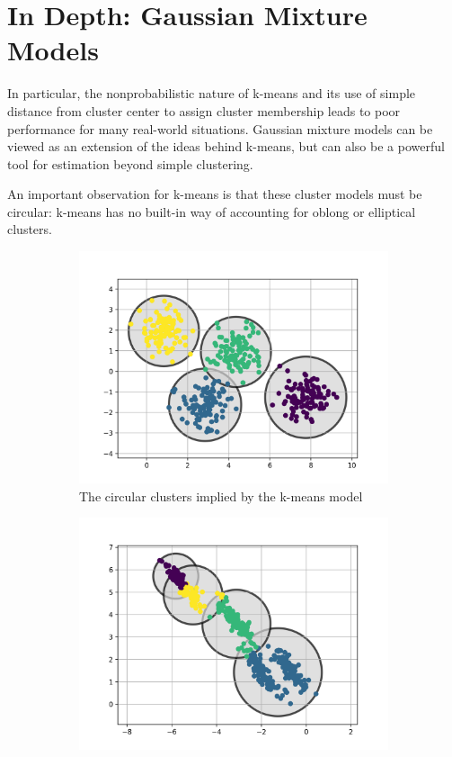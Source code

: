 \chapter{In Depth: Gaussian Mixture Models\label{Ch48}}
In particular, the nonprobabilistic nature of k-means and its use of simple
distance from cluster center to assign cluster membership leads to poor performance
for many real-world situations. Gaussian mixture models can be viewed as an extension of the ideas behind k-means, but can
also be a powerful tool for estimation beyond simple clustering.

An important observation for k-means is that these cluster models must be circular: k-means has no built-in way of accounting for oblong or elliptical clusters.

\begin{figure}
    \centering
    \begin{subfigure}[f]{.45\textwidth}
        \includegraphics[width=\textwidth]{../Figures/fig48-2.png}
        \caption{The circular clusters implied by the k-means model}
    \end{subfigure}
    \hfill
    \begin{subfigure}[f]{.45\textwidth}
        \includegraphics[width=\textwidth]{../Figures/fig48-3.png}

\end{subfigure}
\end{figure}
